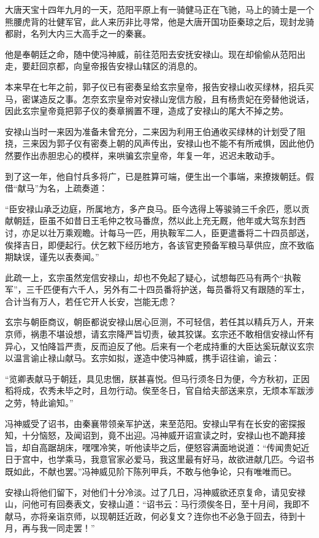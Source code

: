 \documentclass[12pt,oneside]{book}
\begin{document}
大唐天宝十四年九月的一天，范阳平原上有一骑健马正在飞驰，马上的骑士是一个熊腰虎背的壮健军官，此人来历非比寻常，他是大唐开国功臣秦琼之后，现封龙骑都尉，名列大内三大高手之一的秦襄。

他是奉朝廷之命，随中使冯神威，前往范阳去安抚安禄山。现在却偷偷从范阳出走，要赶回京都，向皇帝报告安禄山辖区的消息的。

本来早在七年之前，郭子仪已有密奏呈给玄宗皇帝，报告安禄山收买绿林，招兵买马，密谋造反之事。怎奈玄宗皇帝对安禄山宠信方殷，且有杨贵妃在旁替他说话，因此玄宗皇帝竟把郭子仪的奏章搁置不理，造成了安禄山的尾大不掉之势。

安禄山当时一来因为准备未曾充分，二来因为利用王伯通收买绿林的计划受了阻挠，三来因为郭子仪有密奏上朝的风声传出，安禄山也不能不有所戒惧，因此他仍然要作出赤胆忠心的模样，来哄骗玄宗皇帝，年复一年，迟迟未敢动手。

到了这一年，他自忖兵多将广，已是胜算可端，便生出一个事端，来撩拨朝廷。假借``献马''为名，上疏奏道：

``臣安禄山承乏边庭，所属地方，多产良马。臣今选得上等骏骑三千余匹，愿以贡献朝廷，臣虽不如昔日王毛仲之牧马番庶，然以此上充无厩，他年或大驾东封西讨，亦足以壮万乘观瞻。计每马一匹，用执鞍军二人，臣更遣番将二十四员部送，俟择吉日，即便起行。伏乞敕下经历地方，各该官吏预备军粮马草供应，庶不致临期缺误，谨先以表奏闻。''

此疏一上，玄宗虽然宠信安禄山，却也不免起了疑心，试想每匹马有两个``执鞍军''，三千匹便有六千人，另外有二十四员番将护送，每员番将又有跟随的军士，合计当有万人，若任它开人长安，岂能无虑？

玄宗与朝臣商议，朝臣都说安禄山居心叵测，不可轻信，若任其以精兵万人，开来京师，祸患不堪设想，请玄宗降严旨切责，破其狡谋。玄宗还不敢相信安禄山怀有异心，又怕降旨严责，反而迫反了他。后来有一个老成持重的大臣达奚玩献议玄宗以温言谕止禄山献马。玄宗如拟，遂造中使冯神威，携手诏往谕，谕云：

``览卿表献马于朝廷，具见忠悃，朕甚喜悦。但马行须冬日为便，今方秋初，正因稻将成，农秀未毕之时，且勿行动。俟至冬日，官自给夫部送来京，无烦本军跋涉之劳，特此谕知。''

冯神威受了诏书，由秦襄带领亲军护送，来至范阳。安禄山早有在长安的密探报知，十分恼怒，及闻诏到，竟不出迎。冯神威开诏宣读之时，安禄山也不跪拜接旨，却自高踞胡床，嘿嘿冷笑，听他读毕之后，便怒容满面地说道：``传闻贵妃近日于宫中，也学乘马，我意官家必爱马，我这里最有好马，故欲进献几匹。今诏书既如此，不献也罢。''冯神威见阶下陈列甲兵，不敢与他争论，只有唯唯而已。

安禄山将他们留下，对他们十分冷淡。过了几日，冯神威欲还京复命，请见安禄山，问他可有回奏表文，安禄山道：``诏书云：马行须俟冬日，至十月间，我即不献马，亦将亲诣京师，以现朝廷近政，何必复文？连你也不必急于回去，待到十月，再与我一同走罢！''
\end{document}
